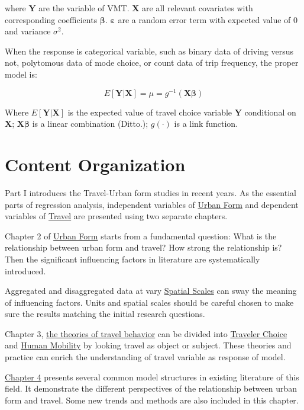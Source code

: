\documentclass[
  11pt,
  openany]{memoir}
\begin{document}
where \(\mathbf{Y}\) are the variable of VMT. \(\mathbf{X}\) are all relevant covariates with corresponding coefficients \(\boldsymbol{\beta}\). \(\boldsymbol{\varepsilon}\) are a random error term with expected value of \(0\) and variance \(\sigma^2\).

When the response is categorical variable, such as binary data of driving versus not, polytomous data of mode choice, or count data of trip frequency, the proper model is:

\begin{equation}
E[\mathbf{Y}|\mathbf{X}]=\mu=g^{-1}(\mathbf{X}\boldsymbol{\beta})
\label{eq:glm}
\end{equation}

Where \(E[\mathbf{Y}|\mathbf{X}]\) is the expected value of travel choice variable \(\mathbf{Y}\) conditional on \(\mathbf{X}\); \(\mathbf{X}\boldsymbol{\beta}\) is a linear combination (Ditto.); \(g(\cdot)\) is a link function.

\hypertarget{content-organization}{%
\section{Content Organization}\label{content-organization}}

Part I introduces the Travel-Urban form studies in recent years.
As the essential parts of regression analysis, independent variables of \protect\hyperlink{form}{Urban Form} and dependent variables of \protect\hyperlink{travel}{Travel} are presented using two separate chapters.

Chapter 2 of \protect\hyperlink{form}{Urban Form} starts from a fundamental question: What is the relationship between urban form and travel? How strong the relationship is?
Then the significant influencing factors in literature are systematically introduced.

Aggregated and disaggregated data at vary \protect\hyperlink{scale}{Spatial Scales} can sway the meaning of influencing factors. Units and spatial scales should be careful chosen to make sure the results matching the initial research questions.

Chapter 3, \protect\hyperlink{travel}{the theories of travel behavior} can be divided into \protect\hyperlink{traveler-choice}{Traveler Choice} and \protect\hyperlink{human-mobility}{Human Mobility} by looking travel as object or subject.
These theories and practice can enrich the understanding of travel variable as response of model.

\protect\hyperlink{struc}{Chapter 4} presents several common model structures in existing literature of this field. It demonstrate the different perspectives of the relationship between urban form and travel. Some new trends and methods are also included in this chapter.
\end{document}
